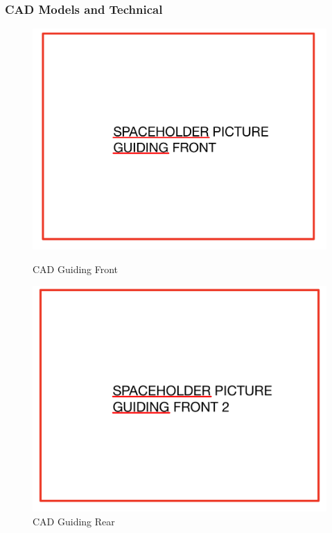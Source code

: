 \subsubsection{CAD Models and Technical }
\begin{figure}[!ht]
  \centering
  \begin{minipage}[b]{0.45\linewidth}
    \includegraphics[width=\linewidth]{texfiles/mech/eimg/braking/guiding_front_1.jpg}
    \caption{CAD Guiding Front}
    \label{fig:guiding_front}
  \end{minipage}
  \hspace{0.5cm}
  \begin{minipage}[b]{0.45\linewidth}
    \includegraphics[width=\linewidth]{texfiles/mech/eimg/braking/guiding_front_2.jpg}
    \caption{CAD Guiding Rear}
    \label{fig:guiding_rear}
  \end{minipage}
\end{figure}

